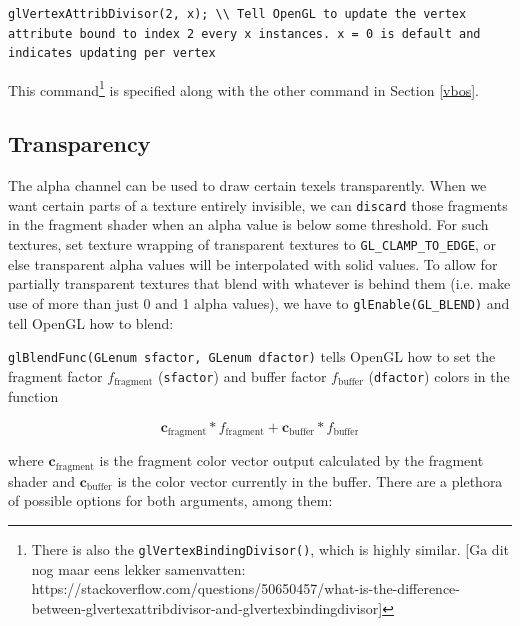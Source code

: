 \documentclass[table, xcdraw]{article}%
\begin{document}
\begin{verbatim}
glVertexAttribDivisor(2, x); \\ Tell OpenGL to update the vertex attribute bound to index 2 every x instances. x = 0 is default and indicates updating per vertex
\end{verbatim}

This command\footnote{There is also the \texttt{glVertexBindingDivisor()}, which is highly similar. [Ga dit nog maar eens lekker samenvatten: https://stackoverflow.com/questions/50650457/what-is-the-difference-between-glvertexattribdivisor-and-glvertexbindingdivisor]} is specified along with the other command in Section \ref{vbos}.

\subsection{Transparency}

The alpha channel can be used to draw certain texels transparently. When we want certain parts of a texture entirely invisible, we can \texttt{discard} those fragments in the fragment shader when an alpha value is below some threshold. For such textures, set texture wrapping of transparent textures to \texttt{GL_CLAMP_TO_EDGE}, or else transparent alpha values will be interpolated with solid values. To allow for partially transparent textures that blend with whatever is behind them (i.e. make use of more than just 0 and 1 alpha values), we have to \texttt{glEnable(GL_BLEND)} and tell OpenGL how to blend:

\texttt{glBlendFunc(GLenum sfactor, GLenum dfactor)} tells OpenGL how to set the fragment factor $f_\text{fragment}$ (\texttt{sfactor}) and buffer factor $f_\text{buffer}$ (\texttt{dfactor}) colors in the function

\begin{equation}
    \bm{c}_\text{fragment} * f_\text{fragment} + \bm{c}_\text{buffer} * f_\text{buffer}
\end{equation}

where $\bm{c}_\text{fragment}$ is the fragment color vector output calculated by the fragment shader and $\bm{c}_\text{buffer}$ is the color vector currently in the buffer. There are a plethora of possible options for both arguments, among them:
\end{document}
